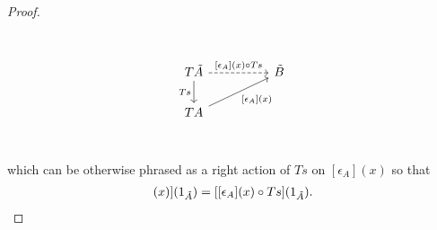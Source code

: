 \documentclass[12pt,a4paper]{article}
\DeclareMathOperator{\Hom}{Hom}
\def\HomA{\ensuremath\mathcal{A}}
\def\HomB{\ensuremath\mathcal{B}}
\def\t{\ensuremath\tilde}
\begin{document}
\begin{proof}
\[\begin{tikzcd}
	&& {} \\
	{T\t A} && {\t B} \\
	{TA}\\
	\arrow["{[\epsilon_A](x)\circ Ts}", dashed, from=2-1, to=2-3]
	\arrow["Ts"', from=2-1, to=3-1]
	\arrow["{[\epsilon_A](x)}"', from=3-1, to=2-3]
\end{tikzcd}\]
which can be otherwise phrased as a right action of $Ts$ on $[\epsilon_A](x)$ so that \begin{align}
[[STs][\epsilon_A](x)](1_{\t A}) = [[\epsilon_A](x)\circ Ts](1_{\t A}).
 \end{align}
% 
% 
% 
% 


\end{proof}
\end{document}
